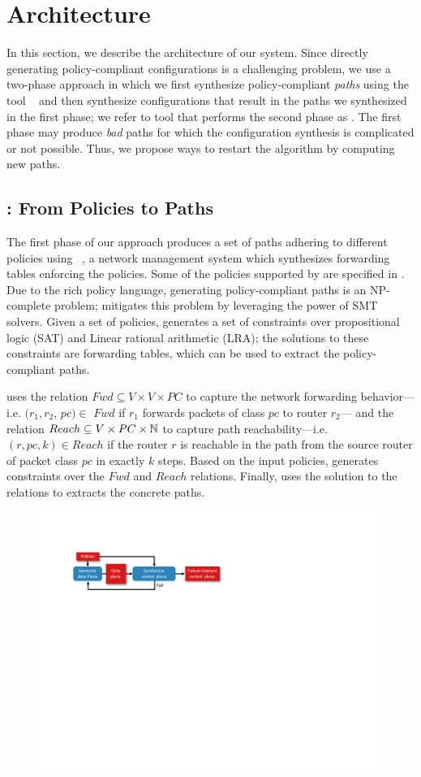 \section{Architecture} \label{sec:architecture}
In this section, we describe the architecture of our system.  Since
directly generating policy-compliant configurations is a challenging
problem, we use a two-phase approach in which we first synthesize
policy-compliant \emph{paths} using the tool \genesis~\cite{genesis}
and then synthesize configurations that result in the paths we
synthesized in the first phase; we refer to tool that performs the second phase as \name.
The first phase may produce \emph{bad} paths for which the
configuration synthesis is complicated or not possible. Thus, we
propose ways to restart the algorithm by computing new paths.

\subsection{\genesis: From Policies to Paths} \label{sec:genesis}
The first phase of our approach produces a set of paths adhering to
different policies using \genesis~\cite{genesis}, a network management
system which synthesizes forwarding tables enforcing the policies. 
Some of the policies supported by \genesis are specified in 
. 
Due to the rich policy language, generating policy-compliant paths is an NP-complete problem;
\genesis mitigates this problem by leveraging the power of SMT solvers.
Given a set of policies, \genesis generates a set of constraints 
over propositional logic (SAT) and Linear rational arithmetic (LRA);
the solutions to these constraints are forwarding
tables, which can be used to extract the 
policy-compliant paths.

\genesis uses the relation $Fwd \subseteq V \times V \times PC $  
to capture 
the network forwarding behavior---i.e. 
$(r_1, r_2$, $pc)\in$ $Fwd$ if 
$r_1$ forwards packets of class $pc$ to router $r_2$---
and 
the relation $Reach \subseteq V \times PC \times \mathbb{N}$ 
to capture
 path reachability---i.e. $(r, pc, k)\in Reach$ if 
the router $r$ is reachable in the path from the source
router of packet class $pc$ in exactly $k$ steps. Based on
the input policies, \genesis generates constraints over the $Fwd$
and $Reach$ relations. Finally, \genesis uses the solution to the relations to extracts the concrete paths.
\begin{figure}
	\centering
	\includegraphics[width=0.5\columnwidth]{figures/architecture.pdf}
	\label{fig:architecture}
\end{figure}
